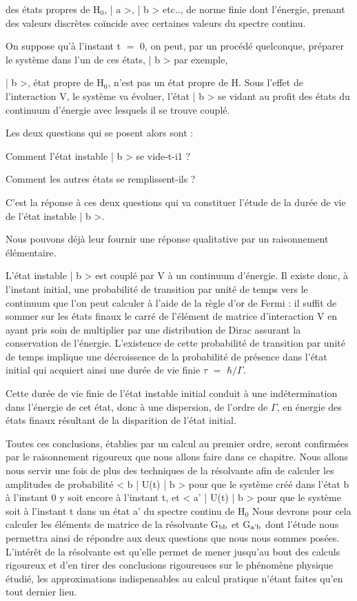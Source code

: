 des états propres de H$_0$, | a >, | b > etc.., de norme finie dont l'énergie,
prenant des valeurs discrètes coïncide avec certaines valeurs du spectre
continu.

On suppose qu'à l'instant t $=$ 0, on peut, par un procédé quelconque,
préparer le système dans l'un de ces états, | b > par exemple,

| b >, état propre de H$_0$, n'est pas un état propre de H. Sous
l'effet de l'interaction V, le système va évoluer, l'état | b > se vidant au
profit des états du continuum d'énergie avec lesquels il se trouve couplé.

Les deux questions qui se posent alors sont :

Comment l'état instable | b > se vide-t-i1 ?

Comment les autres états se remplissent-ils ?

C'est la réponse à ces deux questions qui va constituer l'étude de la
durée de vie de l'état instable | b >.

Nous pouvons déjà leur fournir une réponse qualitative par un raisonnement
élémentaire.

L'état instable | b > est couplé par V à un continuum d'énergie. Il
existe donc, à l'instant initial, une probabilité de transition par unité de
temps vers le continuum que l'on peut calculer à l'aide de la règle d'or de
Fermi : il suffit de sommer sur les états finaux le carré de l'élément de matrice d'interaction V en ayant pris soin de multiplier par une distribution de
Dirac assurant la conservation de l'énergie. L'existence de cette probabilité
de transition par unité de temps implique une décroissence de la probabilité
de présence dans l'état initial qui acquiert ainsi une durée de vie finie
$\tau$ $=$ $\hbar/\Gamma$.

Cette durée de vie finie de l'état instable initial conduit à une
indétermination dans l'énergie de cet état, donc à une dispersion, de l'ordre
de $\Gamma$, en énergie des états finaux résultant de la disparition de l’état initial.

Toutes ces conclusions, établies par un calcul au premier ordre,
seront confirmées par le raisonnement rigoureux que nous allons faire dans
ce chapitre. Nous allons nous servir une fois de plus des techniques de la
résolvante afin de calculer les amplitudes de probabilité < b | U(t) | b >
pour que le système créé dans l'état b à l'instant 0 y soit encore à l'instant
t, et < a' | U(t) | b > pour que le système soit à l'instant t dans un état
a' du spectre continu de H$_0$ Nous devrons pour cela calculer les éléments de
matrice de la résolvante G$_{\text{bb}}$ et G$_{\text{a'b}}$ dont l'étude nous permettra ainsi de répondre aux deux questions que nous nous sommes posées. L'intérêt de la résolvante est qu'elle permet de mener jusqu'au bout des calculs rigoureux et d'en
tirer des conclusions rigoureuses sur le phénomène physique étudié, les approximations indispensables au calcul pratique n'étant faites qu'en tout dernier
lieu.

